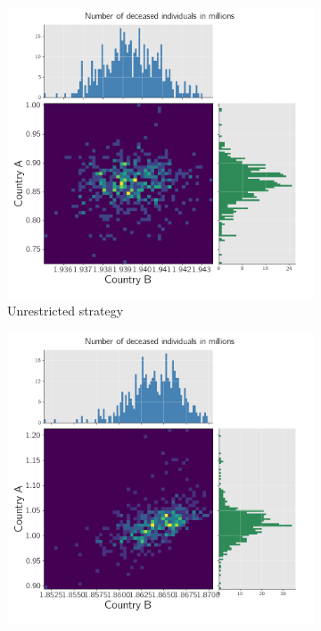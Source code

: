 \begin{figure}[h!]
     \centering
     \begin{subfigure}[b]{0.49\textwidth}
         \centering
         \includegraphics[width=\textwidth]{images/splines_stochastic_histogram_deceased_unrestricted.png}
         \caption{Unrestricted strategy}
         \label{fig:2d_unrestricted}
     \end{subfigure}
     \hfill
     \begin{subfigure}[b]{0.49\textwidth}
         \centering
         \includegraphics[width=\textwidth]{images/splines_stochastic_histogram_deceased_optimal.png}

\end{subfigure}
\end{figure}
